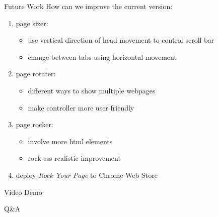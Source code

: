 \documentclass{beamer}
\begin{document}
\begin{frame}{Future Work}
How can we improve the current version:
\begin{enumerate}
    \item page sizer:
        \begin{itemize}
            \item use vertical direction of head movement to control scroll bar
            \item change between tabs using horizontal movement
        \end{itemize}
    \item page rotater:
        \begin{itemize}
            \item different ways to show multiple webpages
            \item make controller more user friendly
        \end{itemize}
    \item page rocker:
        \begin{itemize}
            \item involve more html elements
            \item rock css realistic improvement
        \end{itemize}
    \item deploy \emph{Rock Your Page} to Chrome Web Store
\end{enumerate}
\end{frame}

\begin{frame}
\begin{center}
    \Huge{Video Demo}
\end{center}
\end{frame}

\begin{frame}
\begin{center}
    \Huge{Q\&A}
\end{center}
\end{frame}
\end{document}

